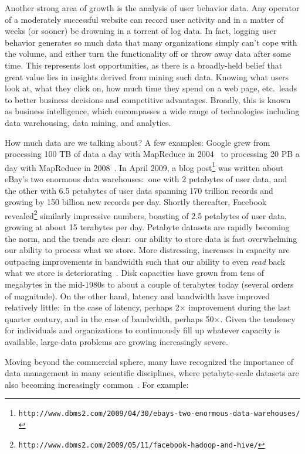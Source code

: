 Another strong area of growth is the analysis of user behavior data.
Any operator of a moderately successful website can record user
activity and in a matter of weeks (or sooner) be drowning in a torrent
of log data.  In fact, logging user behavior generates so much data
that many organizations simply can't cope with the volume, and either
turn the functionality off or throw away data after some time.  This
represents lost opportunities, as there is a broadly-held belief that
great value lies in insights derived from mining such data.  Knowing
what users look at, what they click on, how much time they spend on a
web page, etc.\ leads to better business decisions and competitive
advantages.  Broadly, this is known as business intelligence, which
encompasses a wide range of technologies including data warehousing,
data mining, and analytics.

How much data are we talking about?  A few examples: Google grew from
processing 100 TB of data a day with MapReduce in
2004~\cite{Dean_Ghemawat_OSDI2004} to processing 20 PB a day with
MapReduce in 2008~\cite{Dean_Ghemawat_CACM2008}.  In April 2009, a
blog post\footnote{\texttt{http://www.dbms2.com/2009/04/30/ebays-two-enormous-data-warehouses/}}
was written about eBay's two enormous data warehouses:\ one with 2
petabytes of user data, and the other with 6.5 petabytes of user data
spanning 170 trillion records and growing by 150 billion new records
per day.  Shortly thereafter, Facebook revealed\footnote{\texttt{http://www.dbms2.com/2009/05/11/facebook-hadoop-and-hive/}} similarly
impressive numbers, boasting of 2.5 petabytes of user data, growing at
about 15 terabytes per day.  Petabyte datasets are rapidly becoming
the norm, and the trends are clear:\ our ability to store data is fast
overwhelming our ability to process what we store.  More distressing,
increases in capacity are outpacing improvements in bandwidth such
that our ability to even \emph{read} back what we store is
deteriorating~\cite{Leventhal_2009}.  Disk capacities have grown from
tens of megabytes in the mid-1980s to about a couple of terabytes
today (several orders of magnitude).  On the other hand, latency and
bandwidth have improved relatively little:\ in the case of latency,
perhaps 2$\times$ improvement during the last quarter century, and in
the case of bandwidth, perhaps 50$\times$.  Given the tendency for
individuals and organizations to continuously fill up whatever
capacity is available, large-data problems are growing increasingly
severe.

Moving beyond the commercial sphere, many have recognized the
importance of data management in many scientific disciplines, where
petabyte-scale datasets are also becoming increasingly
common~\cite{Bell_etal_2009}.  For example:

